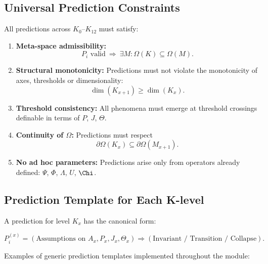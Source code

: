 \subsection{Universal Prediction Constraints}

All predictions across $K_0$–$K_{12}$ must satisfy:

\begin{enumerate}
    \item \textbf{Meta-space admissibility:}  
    \[
    P_i \text{ valid} \ \Longrightarrow\ \exists M : \Omega(K)\subseteq\Omega(M).
    \]

    \item \textbf{Structural monotonicity:}  
    Predictions must not violate the monotonicity of axes, thresholds or  
    dimensionality:
    \[
    \dim(K_{x+1}) \ge \dim(K_x).
    \]

    \item \textbf{Threshold consistency:}  
    All phenomena must emerge at threshold crossings definable in terms of  
    $P$, $J$, $\Theta$.

    \item \textbf{Continuity of $\Omega$:}  
    Predictions must respect  
    \[
    \partial\Omega(K_x)\subseteq \partial\Omega(M_{x+1}).
    \]

    \item \textbf{No ad hoc parameters:}  
    Predictions arise only from operators already defined:  
    $\Psi$, $\Phi$, $\Lambda$, $U$, $\Chi$.
\end{enumerate}

\subsection{Prediction Template for Each K-level}

A prediction for level $K_x$ has the canonical form:

\[
P^{(x)}_i = 
\left(
\text{Assumptions on } A_x, P_x, J_x, \Theta_x
\right)
\Rightarrow
\left(
\text{Invariant / Transition / Collapse}
\right).
\]

Examples of generic prediction templates implemented throughout the module:

